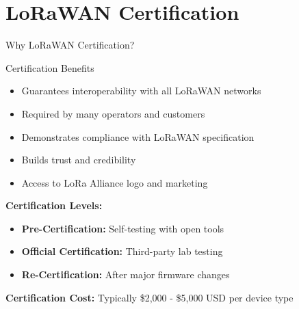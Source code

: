 \documentclass{beamer}
\begin{document}
\section{LoRaWAN Certification}

\begin{frame}{Why LoRaWAN Certification?}
\begin{block}{Certification Benefits}
\begin{itemize}
    \item Guarantees interoperability with all LoRaWAN networks
    \item Required by many operators and customers
    \item Demonstrates compliance with LoRaWAN specification
    \item Builds trust and credibility
    \item Access to LoRa Alliance logo and marketing
\end{itemize}
\end{block}

\vspace{0.3cm}

\textbf{Certification Levels:}
\begin{itemize}
    \item \textbf{Pre-Certification:} Self-testing with open tools
    \item \textbf{Official Certification:} Third-party lab testing
    \item \textbf{Re-Certification:} After major firmware changes
\end{itemize}

\vspace{0.3cm}

\textbf{Certification Cost:} Typically \$2,000 - \$5,000 USD per device type
\end{frame}
\end{document}
